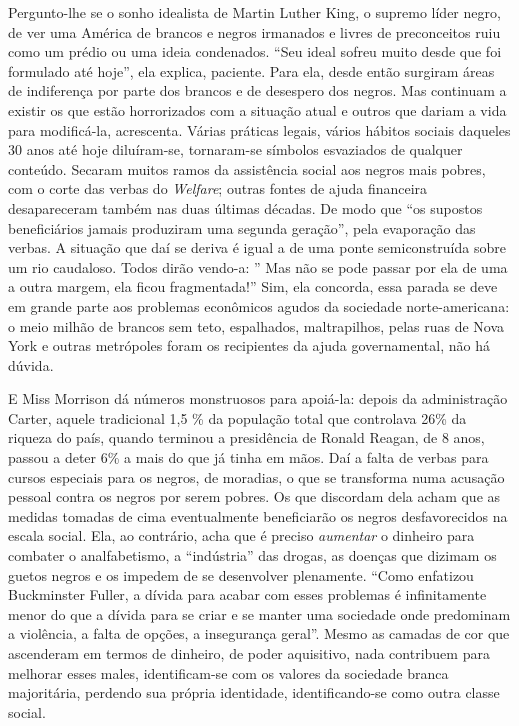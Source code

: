 \documentclass[
  letterpaper,
  DIV=11,
  numbers=noendperiod]{scrreprt}
\begin{document}
Pergunto-lhe se o sonho idealista de Martin Luther King, o supremo líder
negro, de ver uma América de brancos e negros irmanados e livres de
preconceitos ruiu como um prédio ou uma ideia condenados. ``Seu ideal
sofreu muito desde que foi formulado até hoje'', ela explica, paciente.
Para ela, desde então surgiram áreas de indiferença por parte dos
brancos e de desespero dos negros. Mas continuam a existir os que estão
horrorizados com a situação atual e outros que dariam a vida para
modificá-la, acrescenta. Várias práticas legais, vários hábitos sociais
daqueles 30 anos até hoje diluíram-se, tornaram-se símbolos esvaziados
de qualquer conteúdo. Secaram muitos ramos da assistência social aos
negros mais pobres, com o corte das verbas do \emph{Welfare}; outras
fontes de ajuda financeira desapareceram também nas duas últimas
décadas. De modo que ``os supostos beneficiários jamais produziram uma
segunda geração'', pela evaporação das verbas. A situação que daí se
deriva é igual a de uma ponte semiconstruída sobre um rio caudaloso.
Todos dirão vendo-a: '' Mas não se pode passar por ela de uma a outra
margem, ela ficou fragmentada!'' Sim, ela concorda, essa parada se deve
em grande parte aos problemas econômicos agudos da sociedade
norte-americana: o meio milhão de brancos sem teto, espalhados,
maltrapilhos, pelas ruas de Nova York e outras metrópoles foram os
recipientes da ajuda governamental, não há dúvida.

E Miss Morrison dá números monstruosos para apoiá-la: depois da
administração Carter, aquele tradicional 1,5 \% da população total que
controlava 26\% da riqueza do país, quando terminou a presidência de
Ronald Reagan, de 8 anos, passou a deter 6\% a mais do que já tinha em
mãos. Daí a falta de verbas para cursos especiais para os negros, de
moradias, o que se transforma numa acusação pessoal contra os negros por
serem pobres. Os que discordam dela acham que as medidas tomadas de cima
eventualmente beneficiarão os negros desfavorecidos na escala social.
Ela, ao contrário, acha que é preciso \emph{aumentar} o dinheiro para
combater o analfabetismo, a ``indústria'' das drogas, as doenças que
dizimam os guetos negros e os impedem de se desenvolver plenamente.
``Como enfatizou Buckminster Fuller, a dívida para acabar com esses
problemas é infinitamente menor do que a dívida para se criar e se
manter uma sociedade onde predominam a violência, a falta de opções, a
insegurança geral''. Mesmo as camadas de cor que ascenderam em termos de
dinheiro, de poder aquisitivo, nada contribuem para melhorar esses
males, identificam-se com os valores da sociedade branca majoritária,
perdendo sua própria identidade, identificando-se como outra classe
social.
\end{document}
